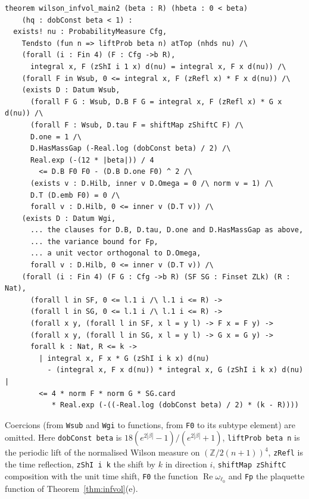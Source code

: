 \documentclass[11pt,a4paper]{article}
\theoremstyle{definition}
\theoremstyle{remark}
\newcommand{\Z}{\mathbb{Z}}
\renewcommand{\Re}{\operatorname{Re}}
\begin{document}
{\small
\begin{verbatim}
theorem wilson_infvol_main2 (beta : R) (hbeta : 0 < beta)
    (hq : dobConst beta < 1) :
  exists! nu : ProbabilityMeasure Cfg,
    Tendsto (fun n => liftProb beta n) atTop (nhds nu) /\
    (forall (i : Fin 4) (F : Cfg ->b R),
      integral x, F (zShI i 1 x) d(nu) = integral x, F x d(nu)) /\
    (forall F in Wsub, 0 <= integral x, F (zRefl x) * F x d(nu)) /\
    (exists D : Datum Wsub,
      (forall F G : Wsub, D.B F G = integral x, F (zRefl x) * G x d(nu)) /\
      (forall F : Wsub, D.tau F = shiftMap zShiftC F) /\
      D.one = 1 /\
      D.HasMassGap (-Real.log (dobConst beta) / 2) /\
      Real.exp (-(12 * |beta|)) / 4
        <= D.B F0 F0 - (D.B D.one F0) ^ 2 /\
      (exists v : D.Hilb, inner v D.Omega = 0 /\ norm v = 1) /\
      D.T (D.emb F0) = 0 /\
      forall v : D.Hilb, 0 <= inner v (D.T v)) /\
    (exists D : Datum Wgi,
      ... the clauses for D.B, D.tau, D.one and D.HasMassGap as above,
      ... the variance bound for Fp,
      ... a unit vector orthogonal to D.Omega,
      forall v : D.Hilb, 0 <= inner v (D.T v)) /\
    (forall (i : Fin 4) (F G : Cfg ->b R) (SF SG : Finset ZLk) (R : Nat),
      (forall l in SF, 0 <= l.1 i /\ l.1 i <= R) ->
      (forall l in SG, 0 <= l.1 i /\ l.1 i <= R) ->
      (forall x y, (forall l in SF, x l = y l) -> F x = F y) ->
      (forall x y, (forall l in SG, x l = y l) -> G x = G y) ->
      forall k : Nat, R <= k ->
        | integral x, F x * G (zShI i k x) d(nu)
          - (integral x, F x d(nu)) * integral x, G (zShI i k x) d(nu) |
        <= 4 * norm F * norm G * SG.card
           * Real.exp (-((-Real.log (dobConst beta) / 2) * (k - R))))
\end{verbatim}
}
Coercions (from \texttt{Wsub} and \texttt{Wgi} to functions, from \texttt{F0} to its subtype element) are omitted. Here \texttt{dobConst beta} is $18(e^{2|\beta|}-1)/(e^{2|\beta|}+1)$, \texttt{liftProb beta n} is the periodic lift of the normalised Wilson measure on $(\Z/2(n+1))^4$, \texttt{zRefl} is the time reflection, \texttt{zShI i k} the shift by $k$ in direction $i$, \texttt{shiftMap zShiftC} composition with the unit time shift, \texttt{F0} the function $\Re\omega_{\ell_0}$ and \texttt{Fp} the plaquette function of Theorem~\ref{thm:infvol}(e).
\end{document}
